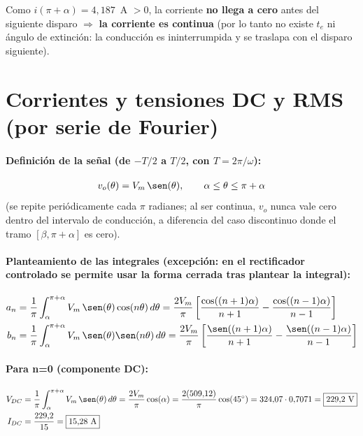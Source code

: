 \documentclass[11pt]{article}
\begin{document}
Como $i(\pi+\alpha) = 4{,}187$~A $>0$, la corriente \textbf{no llega a cero}
antes del siguiente disparo $\Rightarrow$ \textbf{la corriente es continua}
(por lo tanto no existe $t_e$ ni \'angulo de extinci\'on: la conducci\'on es
ininterrumpida y se traslapa con el disparo siguiente).

\section*{Corrientes y tensiones DC y RMS (por serie de Fourier)}

\paragraph{Definici\'on de la se\~nal (de $-T/2$ a $T/2$, con $T=2\pi/\omega$):}
\begin{align*}
v_o(\theta) = V_m\,\sen(\theta), \qquad \alpha \le \theta \le \pi+\alpha
\end{align*}
(se repite peri\'odicamente cada $\pi$ radianes; al ser continua, $v_o$ nunca
vale cero dentro del intervalo de conducci\'on, a diferencia del caso
discontinuo donde el tramo $[\beta,\pi+\alpha]$ es cero).

\paragraph{Planteamiento de las integrales (excepci\'on: en el rectificador
controlado se permite usar la forma cerrada tras plantear la integral):}
\begin{align*}
a_n &= \frac{1}{\pi}\int_{\alpha}^{\pi+\alpha} V_m\,\sen(\theta)\cos(n\theta)\,d\theta
     = \frac{2V_m}{\pi}\left[\frac{\cos((n+1)\alpha)}{n+1} - \frac{\cos((n-1)\alpha)}{n-1}\right] \\
b_n &= \frac{1}{\pi}\int_{\alpha}^{\pi+\alpha} V_m\,\sen(\theta)\sen(n\theta)\,d\theta
     = \frac{2V_m}{\pi}\left[\frac{\sen((n+1)\alpha)}{n+1} - \frac{\sen((n-1)\alpha)}{n-1}\right]
\end{align*}

\paragraph{Para n=0 (componente DC):}
\begin{align*}
V_{DC} &= \frac{1}{\pi}\int_{\alpha}^{\pi+\alpha} V_m\,\sen(\theta)\,d\theta = \frac{2V_m}{\pi}\cos(\alpha) = \frac{2(509{,}12)}{\pi}\cos(45^\circ)
        = 324{,}07\cdot 0{,}7071 = \boxed{229{,}2\ \text{V}} \\
I_{DC} &= \frac{229{,}2}{15} = \boxed{15{,}28\ \text{A}}
\end{align*}
\end{document}
